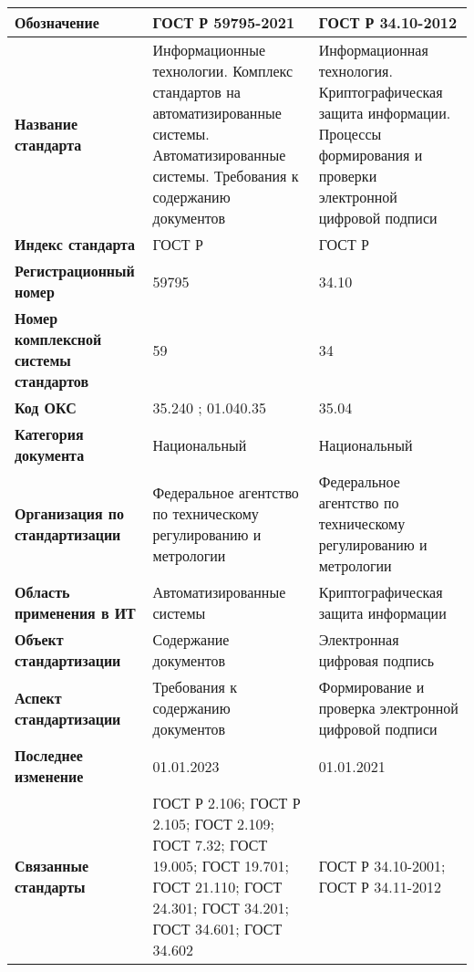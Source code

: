 \begin{table}[h!tp]
	\centering
	\caption{}
	\label{table:national}
	\begin{tabular}{|p{10em}|p{12em}|p{12em}|}
		\hline
		\textbf{Обозначение}
			& \textbf{ГОСТ Р 59795-2021} & \textbf{ГОСТ Р 34.10-2012} \\ \hline
		\textbf{Название стандарта}
			& Информационные технологии. Комплекс стандартов на автоматизированные системы. Автоматизированные системы. Требования к содержанию документов
			& Информационная технология. Криптографическая защита информации. Процессы формирования и проверки электронной цифровой подписи \\ \hline
		\textbf{Индекс стандарта}
			& ГОСТ Р & ГОСТ Р \\ \hline
		\textbf{Регистрационный номер}
			& 59795 & 34.10 \\ \hline
		\textbf{Номер комплексной системы стандартов}
			& 59 & 34 \\ \hline
		\textbf{Код ОКС}
			& 35.240 ; 01.040.35 & 35.04 \\ \hline
		\textbf{Категория документа}
			& Национальный & Национальный \\ \hline
		\textbf{Организация по стандартизации}
			& Федеральное агентство по техническому регулированию и метрологии
			& Федеральное агентство по техническому регулированию и метрологии \\ \hline
		\textbf{Область применения в ИТ}
			& Автоматизированные системы
			& Криптографическая защита информации \\ \hline
		\textbf{Объект стандартизации}
			& Содержание документов & Электронная цифровая подпись \\ \hline
		\textbf{Аспект стандартизации}
			& Требования к содержанию документов
			& Формирование и проверка электронной цифровой подписи \\ \hline
		\textbf{Последнее изменение}
			& 01.01.2023 & 01.01.2021 \\ \hline
		\textbf{Связанные стандарты}
			& ГОСТ Р 2.106; ГОСТ Р 2.105; ГОСТ 2.109; ГОСТ 7.32; ГОСТ 19.005; ГОСТ 19.701; ГОСТ 21.110; ГОСТ 24.301; ГОСТ 34.201; ГОСТ 34.601; ГОСТ 34.602
			& ГОСТ Р 34.10-2001; ГОСТ Р 34.11-2012 \\ \hline
	\end{tabular}
\end{table}

